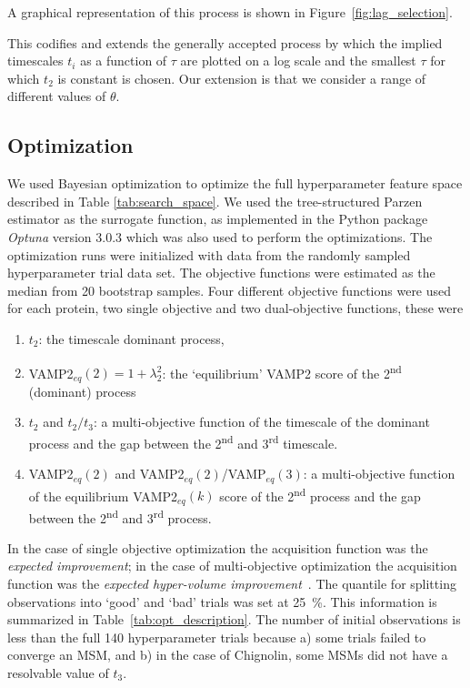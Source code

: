 \documentclass[journal=jacsat,manuscript=article]{achemso}
\begin{document}
A graphical representation of this process is shown in Figure~\ref{fig:lag_selection}. 

This codifies and extends the generally accepted process by which the implied timescales $t_{i}$ as a function of $\tau$ are plotted on a log scale and the smallest $\tau$ for which $t_{2}$ is constant is chosen. Our extension is that we consider a range of different values of $\theta$. 

\subsection{Optimization}

We used Bayesian optimization to optimize the full hyperparameter feature space described in Table \ref{tab:search_space}. We used the tree-structured Parzen estimator as the surrogate function, as implemented in the Python package \textit{Optuna} version 3.0.3 \cite{akiba_optuna_2019} which was also used to perform the optimizations. The optimization runs were initialized with data from the randomly sampled hyperparameter trial data set. The objective functions were estimated as the median from 20 bootstrap samples. Four different objective functions were used for each protein, two single objective and two dual-objective functions, these were 
\begin{enumerate}
    \item $t_2$: the timescale dominant process, 
    \item VAMP2$_{eq}(2) = 1+\lambda_{2}^{2}$: the `equilibrium' VAMP2 score of the 2\textsuperscript{nd} (dominant) process
    \item $t_2$ and $t_{2}/t_{3}$: a multi-objective function of the timescale of the dominant process and the gap between the 2\textsuperscript{nd} and 3\textsuperscript{rd} timescale. 
    \item VAMP2$_{eq}(2)$ and VAMP2$_{eq}(2)$/VAMP$_{eq}(3)$: a multi-objective function of the equilibrium VAMP2$_{eq}(k)$ score of the 2\textsuperscript{nd} process and the gap between the 2\textsuperscript{nd} and 3\textsuperscript{rd} process. 
\end{enumerate}

In the case of single objective optimization the acquisition function was the \emph{expected improvement}; in the case of multi-objective optimization the acquisition function was the \emph{expected hyper-volume improvement}~\cite{ozaki_multitpe_2022}. The quantile for splitting observations into `good' and `bad' trials was set at \SI{25}{\percent}. This information is summarized in Table~\ref{tab:opt_description}. The number of initial observations is less than the full \num{140} hyperparameter trials because a) some trials failed to converge an MSM, and b) in the case of Chignolin, some MSMs did not have a resolvable value of $t_3$.  
\end{document}
